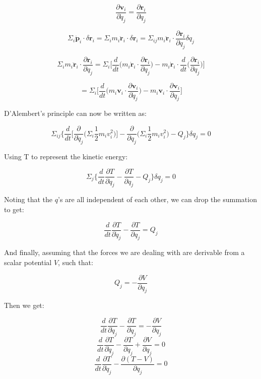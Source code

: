 \documentclass{article}
\begin{document}
$$\frac{ \partial \mathbf{ v }_i }{ \partial \dot{ q }_j } = \frac{ \partial \mathbf{ r }_i }{ \partial q_j }$$

$$\Sigma_i \dot{ \mathbf{ p } }_i \cdot \delta \mathbf{ r }_i = \Sigma_i m_i \ddot{ \mathbf{ { r } } }_i \cdot \delta \mathbf{ r }_i = \Sigma_{ij} m_i \ddot{ \mathbf{ { r } } }_i \cdot \frac{ \partial \mathbf{ r }_i }{ \partial q_j } \delta q_j$$

$$\Sigma_i m_i \ddot{ \mathbf{ r } }_i \cdot \frac{ \partial \mathbf{ r }_i }{ \partial q_j } = \Sigma_i \Big[ \frac{ d }{ dt } \Big( m_i \dot{ \mathbf{ r } }_i \cdot \frac{ \partial \mathbf{ r }_i }{ \partial q_j } \Big) - m_i \dot{ \mathbf{ r } }_i \cdot \frac{ d }{ dt } \Big( \frac{ \partial \mathbf{ r }_i }{ \partial q_j } \Big) \Big]$$

$$ = \Sigma_i \Big[ \frac{ d }{ dt } \Big( m_i \mathbf{ v }_i \cdot \frac{ \partial \mathbf{ v }_i }{ \partial \dot{ q }_j } \Big) - m_i \mathbf{ v }_i \cdot \frac{ \partial \mathbf{ v }_i }{ \partial q_j } \Big]$$

D'Alembert's principle can now be written as:

$$\Sigma_{ij} \Big\{ \frac{ d }{ dt } \Big[ \frac{ \partial }{ \partial \dot{ q }_j  } \Big( \Sigma_i \frac{ 1 }{ 2 }m_i v_i^2 \Big) \Big] - \frac{ \partial }{ \partial q_j } \Big( \Sigma_i \frac{ 1 }{ 2 } m_i v_i^2 \Big) - Q_j \Big\} \delta q_j = 0$$

Using T to represent the kinetic energy:

$$\Sigma_j \Big\{ \frac{ d }{ dt } \frac{ \partial T }{ \partial \dot{ q }_j  } - \frac{ \partial T }{ \partial q_j } - Q_j \Big\} \delta q_j = 0$$

Noting that the $q$'s are all independent of each other, we can drop the summation to get:

$$\frac{ d }{ dt } \frac{ \partial T }{ \partial \dot{ q }_j  } - \frac{ \partial T }{ \partial q_j } = Q_j$$

And finally, assuming that the forces we are dealing with are derivable from a scalar potential $V$, such that:

$$Q_j = -\frac{ \partial V }{ \partial q_j }$$

Then we get:

$$\frac{ d }{ dt } \frac{ \partial T }{ \partial \dot{ q }_j  } - \frac{ \partial T }{ \partial q_j } = -\frac{ \partial V }{ \partial q_j }$$
$$\frac{ d }{ dt } \frac{ \partial T }{ \partial \dot{ q }_j  } - \frac{ \partial T }{ \partial q_j } + \frac{ \partial V }{ \partial q_j } = 0$$
$$\frac{ d }{ dt } \frac{ \partial T }{ \partial \dot{ q }_j  } - \frac{ \partial ( T - V ) }{ \partial q_j } = 0$$
\end{document}
